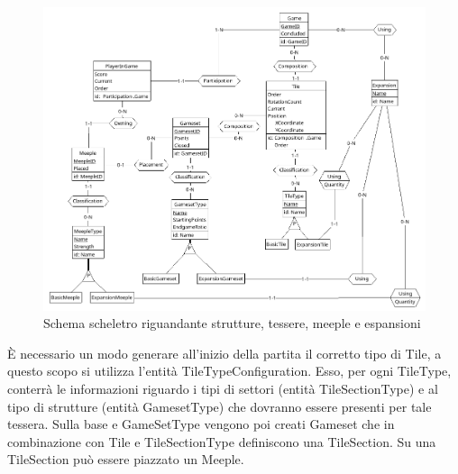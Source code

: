 \begin{figure}[hb]
    \centering\includegraphics[scale=0.24]{images/Progettazione/Concettuale/Scheletro2.png}
    \caption{Schema scheletro riguandante strutture, tessere, meeple e espansioni}
\end{figure}
\medskip
È necessario un modo generare all'inizio della partita il corretto tipo di Tile, a questo scopo si utilizza l'entità TileTypeConfiguration. Esso, per ogni TileType, conterrà le informazioni riguardo i tipi di settori (entità TileSectionType) e al tipo di strutture (entità GamesetType) che dovranno essere presenti per tale tessera. Sulla base e GameSetType vengono poi creati Gameset che in combinazione con Tile e TileSectionType definiscono una TileSection. Su una TileSection può essere piazzato un Meeple.
